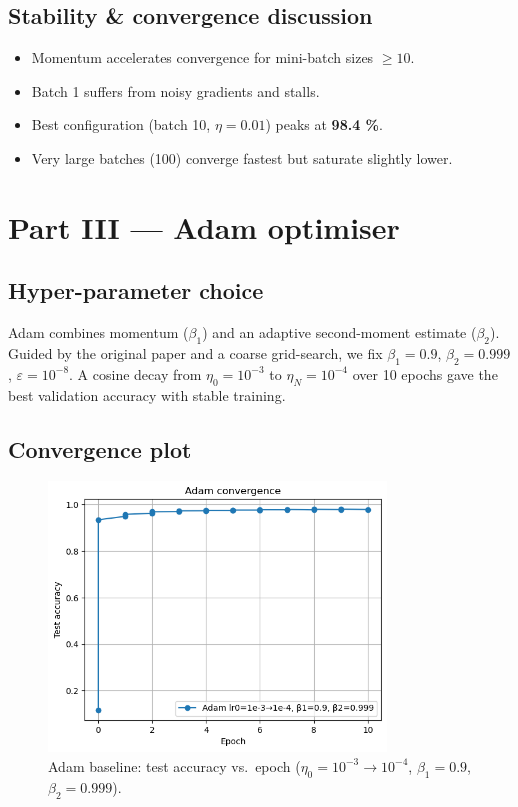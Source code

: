 \documentclass[11pt]{article}
\begin{document}
\subsection{Stability \& convergence discussion}
\begin{itemize}
  \item Momentum accelerates convergence for mini-batch sizes $\ge 10$.
  \item Batch 1 suffers from noisy gradients and stalls.
  \item Best configuration (batch 10, $\eta=0.01$) peaks at
        \textbf{98.4 \%}.
  \item Very large batches (100) converge fastest but saturate slightly lower.
\end{itemize}

\section{Part III — Adam optimiser}

\subsection{Hyper-parameter choice}
Adam combines momentum ($\beta_1$) and an adaptive second-moment
estimate ($\beta_2$).  Guided by the original paper and a coarse
grid-search, we fix $\beta_1=0.9$, $\beta_2=0.999$, $\varepsilon=10^{-8}$.
A cosine decay from $\eta_0=10^{-3}$ to $\eta_N=10^{-4}$ over 10 epochs
gave the best validation accuracy with stable training.

\subsection{Convergence plot}
\begin{figure}[H]
  \centering
  \includegraphics[width=0.8\textwidth]{figures/adam_baseline.png}
  \caption{Adam baseline: test accuracy vs.\ epoch
           ($\eta_0=10^{-3}\!\rightarrow\!10^{-4}$,
           $\beta_1=0.9$, $\beta_2=0.999$).}
\end{figure}
\end{document}
